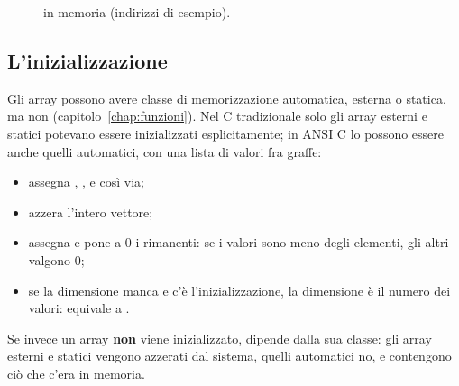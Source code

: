 \begin{figure}[H]
  \centering
  \caption{ in memoria (indirizzi di
           esempio).}
  \label{fig:array-memoria}
\end{figure}

\subsection{L'inizializzazione}

Gli array possono avere classe di memorizzazione automatica, esterna o
statica, ma non  (capitolo~\ref{chap:funzioni}). Nel C
tradizionale solo gli array esterni e statici potevano essere inizializzati
esplicitamente; in ANSI C lo possono essere anche quelli automatici, con
una lista di valori fra graffe:

\begin{itemize}
  \item {} assegna
        , , e così via;
  \item {} azzera l'intero vettore;
  \item {} assegna  e pone a 0 i
        rimanenti: se i valori sono meno degli elementi, gli altri valgono 0;
  \item se la dimensione manca e c'è l'inizializzazione, la dimensione è il
        numero dei valori:  equivale a
        .
\end{itemize}

Se invece un array \textbf{non} viene inizializzato, dipende dalla sua
classe: gli array esterni e statici vengono azzerati dal sistema, quelli
automatici no, e contengono ciò che c'era in memoria.


